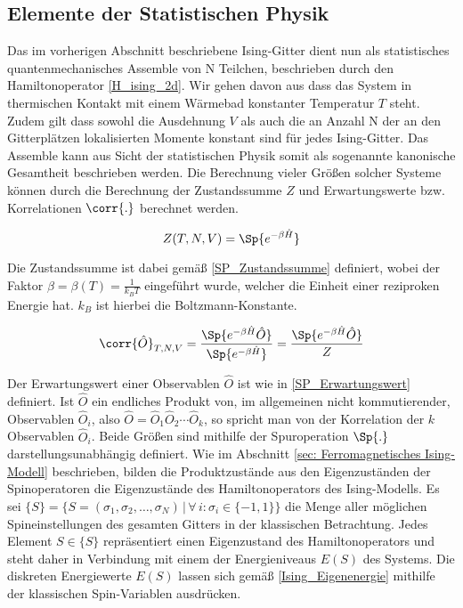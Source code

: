 \subsection{Elemente der Statistischen Physik}

Das im vorherigen Abschnitt beschriebene Ising-Gitter dient nun als statistisches quantenmechanisches Assemble von N Teilchen, beschrieben durch den Hamiltonoperator  \eqref{H_ising_2d}. Wir gehen davon aus dass das System in thermischen Kontakt mit einem Wärmebad konstanter Temperatur $T$ steht. Zudem gilt dass sowohl die Ausdehnung $V$ als auch die an Anzahl N der an den Gitterplätzen lokalisierten Momente konstant sind für jedes Ising-Gitter. Das Assemble kann aus Sicht der statistischen Physik somit als sogenannte kanonische Gesamtheit beschrieben werden. Die Berechnung vieler Größen solcher Systeme können durch die Berechnung der Zustandssumme $Z$ und Erwartungswerte bzw. Korrelationen $\corr{.}$ berechnet werden.

\begin{equation} \label{SP_Zustandssumme}
    Z(T,N,V) = \Sp{e^{-\beta \hat{H}}}
\end{equation}

\noindent Die Zustandssumme ist dabei gemäß \eqref{SP_Zustandssumme} definiert, wobei der Faktor $\beta = \beta\left(T\right) = \frac{1}{k_B T} $ eingeführt wurde, welcher die Einheit einer reziproken Energie hat. $k_B$ ist hierbei die Boltzmann-Konstante.

\begin{equation} \label{SP_Erwartungswert}
    \corr{\hat{O}}_{T,N,V} = \frac{\Sp{e^{-\beta \hat{H}} \hat{O}}}{\Sp{e^{-\beta \hat{H}}}} =  \frac{\Sp{e^{-\beta \hat{H}} \hat{O}}}{Z}
\end{equation}

\noindent Der Erwartungswert einer Observablen $\hat{O}$ ist wie in \eqref{SP_Erwartungswert} definiert. Ist $\hat{O}$ ein endliches Produkt von, im allgemeinen nicht kommutierender, Observablen $\hat{O}_i$, also $\hat{O} = \hat{O}_1 \hat{O}_2 \cdots \hat{O}_k$, so spricht man von der Korrelation der $k$ Observablen $\hat{O}_i$. Beide Größen sind mithilfe der Spuroperation $\Sp{.}$ darstellungsunabhängig definiert. Wie im Abschnitt \ref{sec: Ferromagnetisches Ising-Modell} beschrieben, bilden die Produktzustände aus den Eigenzuständen der Spinoperatoren die Eigenzustände des Hamiltonoperators des Ising-Modells. Es sei $\{S\} = \{S = (\sigma_1, \sigma_2, \dots,\sigma_N) \,\vert\, \forall\,i : \sigma_i \in \{-1, 1\}\}$ die Menge aller möglichen Spineinstellungen des gesamten Gitters  in der klassischen Betrachtung. Jedes Element $S \in \{S\}$ repräsentiert einen Eigenzustand des Hamiltonoperators und steht daher in Verbindung mit einem der Energieniveaus $E(S)$ des Systems. Die diskreten Energiewerte $E(S)$ lassen sich gemäß \eqref{Ising_Eigenenergie} mithilfe der klassischen Spin-Variablen ausdrücken.

